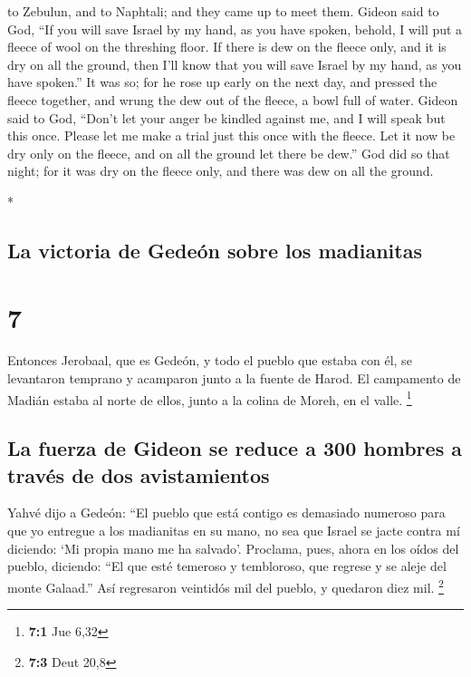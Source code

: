 \begin{paracol}{2}
\begin{otherlanguage}{english}
to Zebulun, and to Naphtali; and they came up to meet them.
 Gideon said to God, ``If you will save Israel by my
hand, as you have spoken,  behold, I will put a fleece of
wool on the threshing floor. If there is dew on the fleece only, and it
is dry on all the ground, then I'll know that you will save Israel by my
hand, as you have spoken.''  It was so; for he rose up
early on the next day, and pressed the fleece together, and wrung the
dew out of the fleece, a bowl full of water.  Gideon said
to God, ``Don't let your anger be kindled against me, and I will speak
but this once. Please let me make a trial just this once with the
fleece. Let it now be dry only on the fleece, and on all the ground let
there be dew.''  God did so that night; for it was dry on
the fleece only, and there was dew on all the ground.

\end{otherlanguage}

\switchcolumn[0]*

\hypertarget{la-victoria-de-gedeuxf3n-sobre-los-madianitas}{%
\subsection{La victoria de Gedeón sobre los
madianitas}\label{la-victoria-de-gedeuxf3n-sobre-los-madianitas}}

\hypertarget{section-12}{%
\section{7}\label{section-12}}

 Entonces Jerobaal, que es Gedeón, y todo el pueblo que
estaba con él, se levantaron temprano y acamparon junto a la fuente de
Harod. El campamento de Madián estaba al norte de ellos, junto a la
colina de Moreh, en el valle. \footnote{\textbf{7:1} Jue 6,32}

\hypertarget{la-fuerza-de-gideon-se-reduce-a-300-hombres-a-travuxe9s-de-dos-avistamientos}{%
\subsection{La fuerza de Gideon se reduce a 300 hombres a través de dos
avistamientos}\label{la-fuerza-de-gideon-se-reduce-a-300-hombres-a-travuxe9s-de-dos-avistamientos}}

 Yahvé dijo a Gedeón: ``El pueblo que está contigo es
demasiado numeroso para que yo entregue a los madianitas en su mano, no
sea que Israel se jacte contra mí diciendo: `Mi propia mano me ha
salvado'.  Proclama, pues, ahora en los oídos del pueblo,
diciendo: ``El que esté temeroso y tembloroso, que regrese y se aleje
del monte Galaad.'' Así regresaron veintidós mil del pueblo, y quedaron
diez mil. \footnote{\textbf{7:3} Deut 20,8}


\end{paracol}
